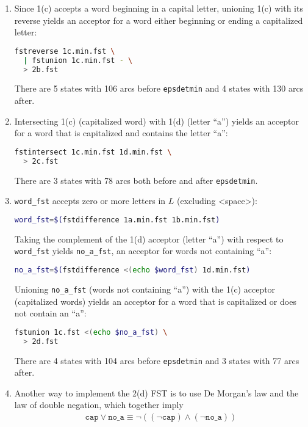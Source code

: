 \documentclass[a4paper,oneside,reqno]{amsart}
\begin{document}
\begin{enumerate}[label=\arabic*.]
\begin{enumerate}[label=(\alph*)]
      \item Since 1(c) accepts a word beginning in a capital letter, unioning
        1(c) with its reverse yields an acceptor for a word either beginning or
        ending a capitalized letter:
        \begin{lstlisting}[language=bash]
fstreverse 1c.min.fst \
  | fstunion 1c.min.fst - \
  > 2b.fst
        \end{lstlisting}
        There are 5 states with 106 arcs before \texttt{epsdetmin} and 4
        states with 130 arcs after.

      \item Intersecting 1(c) (capitalized word) with 1(d) (letter ``a'') yields
        an acceptor for a word that is capitalized and contains the letter ``a'':
        \begin{lstlisting}[language=bash]
fstintersect 1c.min.fst 1d.min.fst \
  > 2c.fst
        \end{lstlisting}
        There are 3 states with 78 arcs both before and after \texttt{epsdetmin}.

      \item \texttt{word\_fst} accepts zero or more letters in $L$ (excluding
        <space>):
        \begin{lstlisting}[language=bash]
word_fst=$(fstdifference 1a.min.fst 1b.min.fst)
        \end{lstlisting}

        Taking the complement of the 1(d) acceptor (letter ``a'') with respect to
        \texttt{word\_fst} yields \texttt{no\_a\_fst}, an acceptor for words
        not containing ``a'':
        \begin{lstlisting}[language=bash]
no_a_fst=$(fstdifference <(echo $word_fst) 1d.min.fst)
        \end{lstlisting}

        Unioning \texttt{no\_a\_fst} (words not containing ``a'') with
        the 1(c) acceptor (capitalized words) yields an acceptor for
        a word that is capitalized or does not contain an ``a'':
        \begin{lstlisting}[language=bash]
fstunion 1c.fst <(echo $no_a_fst) \
  > 2d.fst
        \end{lstlisting}
        There are 4 states with 104 arcs before \texttt{epsdetmin} and 3
        states with 77 arcs after.

      \item Another way to implement the 2(d) FST is to use De Morgan's law and
        the law of double negation, which together imply
        \begin{align}
          \texttt{cap} \lor \texttt{no\_a} \equiv
          \lnot ((\lnot \texttt{cap}) \land (\lnot \texttt{no\_a}))
        \end{align}


\end{enumerate}
\end{enumerate}
\end{document}
